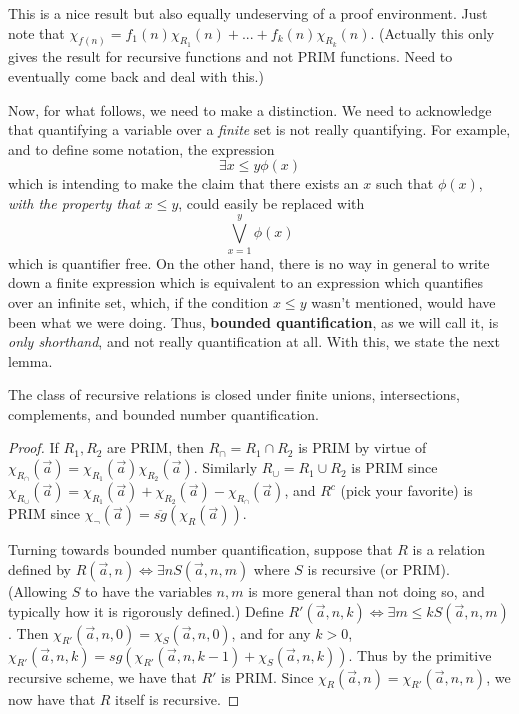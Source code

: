 This is a nice result but also equally undeserving of a proof environment. Just note that $\chi_{f(n)} = f_1(n)\chi_{R_1}(n) + ... + f_k(n)\chi_{R_k}(n)$. (Actually this only gives the result for recursive functions and not PRIM functions. Need to eventually come back and deal with this.)
\par Now, for what follows, we need to make a distinction. We need to acknowledge that quantifying a variable over a \textit{finite} set is not really quantifying. For example, and to define some notation, the expression 
\[ \exists x \leq y \phi(x)  \]
which is intending to make the claim that there exists an $x$ such that $\phi(x)$, \textit{with the property that} $x \leq y$, could easily be replaced with
\[ \bigvee_{x = 1}^y \phi(x) \]
which is quantifier free. On the other hand, there is no way in general to write down a finite expression which is equivalent to an expression which quantifies over an infinite set, which, if the condition $x \leq y$ wasn't mentioned, would have been what we were doing. Thus, \textbf{bounded quantification}, as we will call it, is \textit{only shorthand}, and not really quantification at all. With this, we state the next lemma.
\begin{lemma}
    The class of recursive relations is closed under finite unions, intersections, complements, and bounded number quantification.
\end{lemma}
\begin{proof}
    If $R_1,R_2$ are PRIM, then $R_{\cap} = R_1 \cap R_2$ is PRIM by virtue of $\chi_{R_{\cap}}(\vec{a}) = \chi_{R_1}(\vec{a})\chi_{R_2}(\vec{a})$. Similarly $R_{\cup} = R_1 \cup R_2$ is PRIM since $\chi_{R_{\cup}}(\vec{a}) = \chi_{R_1}(\vec{a}) + \chi_{R_2}(\vec{a}) - \chi_{R_{\cap}}(\vec{a})$, and $R^c$ (pick your favorite) is PRIM since $\chi_{\neg}(\vec{a}) = \overline{sg}(\chi_R(\vec{a}))$. 
    \par Turning towards bounded number quantification, suppose that $R$ is a relation defined by $R(\vec{a},n) \iff \exists n S(\vec{a},n,m)$ where $S$ is recursive (or PRIM). (Allowing $S$ to have the variables $n,m$ is more general than not doing so, and typically how it is rigorously defined.) Define $R'(\vec{a},n,k) \iff \exists m \leq k S(\vec{a},n,m)$. Then $\chi_{R'}(\vec{a},n,0) = \chi_S(\vec{a},n,0)$, and for any $k > 0$, $\chi_{R'}(\vec{a},n,k) = sg(\chi_{R'}(\vec{a},n,k-1)+\chi_S(\vec{a},n,k))$. Thus by the primitive recursive scheme, we have that $R'$ is PRIM. Since $\chi_R(\vec{a},n) = \chi_{R'}(\vec{a},n,n)$, we now have that $R$ itself is recursive. 
\end{proof}
